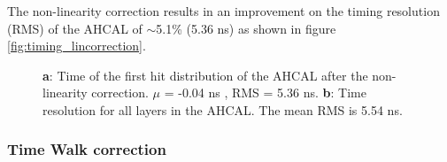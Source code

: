\documentclass[twoside,a4paper,11pt]{article}
\begin{document}
The non-linearity correction results in an improvement on the timing resolution (RMS) of the AHCAL of $\sim$5.1\% (5.36 ns) as shown in figure \ref{fig:timing_lincorrection}.
\begin{figure}[htbp]
	\hfill
	\hfill
\caption[]{\textbf{a}: Time of the first hit distribution of the AHCAL after the non-linearity correction. $\mu$ = -0.04 ns , RMS = 5.36 ns. \textbf{b}: Time resolution for all layers in the AHCAL. The mean RMS is 5.54 ns.}
\end{figure}

\subsubsection{Time Walk correction}
\label{subsec:timewalk}
\end{document}
